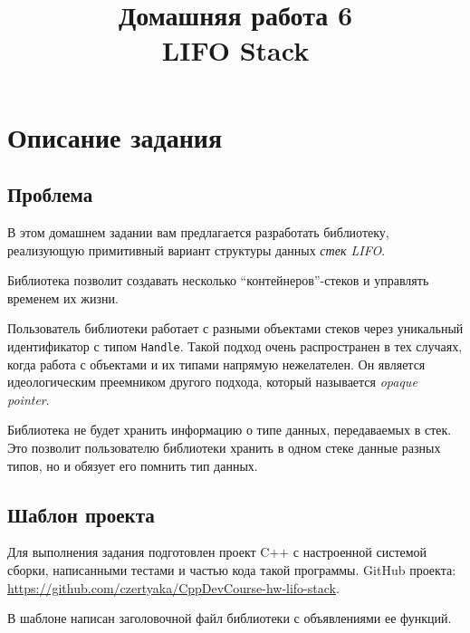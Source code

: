 \documentclass[14pt]{extarticle}
\title{Домашняя работа 6 \\ LIFO Stack}
\begin{document}
\maketitle

\tableofcontents

\section{Описание задания}

    \subsection{Проблема}
    
        В этом домашнем задании вам предлагается разработать библиотеку,
        реализующую примитивный вариант структуры данных \textit{стек LIFO}\footnotemark{}.

    
        Библиотека позволит создавать несколько \enquote{контейнеров}-стеков и
        управлять временем их жизни.

        Пользователь библиотеки работает с разными объектами стеков через
        уникальный идентификатор с типом \texttt{Handle}.
        Такой подход очень распространен в тех случаях, когда работа с объектами
        и их типами напрямую нежелателен.
        Он является идеологическим преемником другого подхода, который называется
        \textit{opaque pointer}\footnotemark{}.


        Библиотека не будет хранить информацию о типе данных, передаваемых в
        стек.
        Это позволит пользователю библиотеки хранить в одном стеке данные разных
        типов, но и обязует его помнить тип данных.

    \subsection{Шаблон проекта}
    
        Для выполнения задания подготовлен проект C++ с настроенной системой сборки,
        написанными тестами и частью кода такой программы.
        GitHub проекта: \url{https://github.com/czertyaka/CppDevCourse-hw-lifo-stack}.

        В шаблоне написан заголовочной файл библиотеки с объявлениями
        ее функций.
\end{document}
